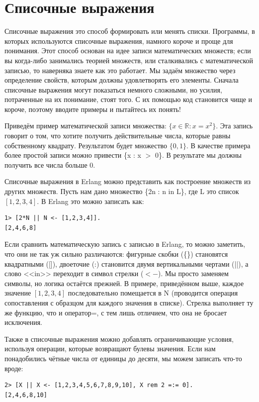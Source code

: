 \documentclass[a4paper,12pt]{report}
\newcommand{\ops}{\colorbox{lgreen}}
\begin{document}
\section{Списочные выражения}
Списочные выражения это способ формировать или менять списки. Программы, в которых используются списочные выражения, намного короче и проще для понимания. Этот способ основан на идее записи математических множеств; если вы когда\--либо занимались теорией множеств, или сталкивались с математической записью, то наверняка знаете как это работает. Мы задаём множество через определение свойств, которым должны удовлетворять его элементы. Сначала списочные выражения могут показаться немного сложными, но усилия, потраченные на их понимание, стоят того. С их помощью код становится чище и короче, поэтому вводите примеры и пытайтесь их понять!

Приведём пример математической записи множества: $\{x \in 
\mathbb{R}: x = x^2\}$. Эта запись говорит о том, что хотите получить действительные числа, которые равны собственному квадрату. Результатом будет множество $\{0, 1\}$. В качестве примера более простой записи можно привести \ops{\{x : x $>$ 0\}}. В результате мы должны получить все числа больше 0.

Списочные выражения в Erlang можно представить как построение множеств из других множеств. Пусть нам дано множество \ops{\{2n : n in L\}}, где L это список $[1, 2, 3, 4]$. В Erlang это можно записать как:\\ 
\begin{lstlisting}[style=repl]
1> [2*N || N <- [1,2,3,4]].
[2,4,6,8]
\end{lstlisting}

Если сравнить математическую запись с записью в Erlang, то можно заметить, что они не так уж сильно различаются: фигурные скобки (\{\}) становятся квадратными ([]), двоеточие (:) становится двумя вертикальными чертами (||), а слово <<in>> переходит в символ стрелки ($<-$). Мы просто заменяем символы, но логика остаётся прежней. В примере, приведённом выше, каждое значение $[1, 2, 3, 4]$ последовательно помещается в N (проводится операция сопоставления с образцом для каждого значения в списке). Стрелка выполняет ту же функцию, что и оператор\ops{=}, с тем лишь отличием, что она не бросает исключения.

Также в списочные выражения можно добавлять ограничивающие условия, используя операции, которые возвращают булевы значения. Если нам понадобились чётные числа от единицы до десяти, мы можем записать что\--то вроде:
\begin{lstlisting}[style=repl]
2> [X || X <- [1,2,3,4,5,6,7,8,9,10], X rem 2 =:= 0].
[2,4,6,8,10]
\end{lstlisting}
\end{document}
